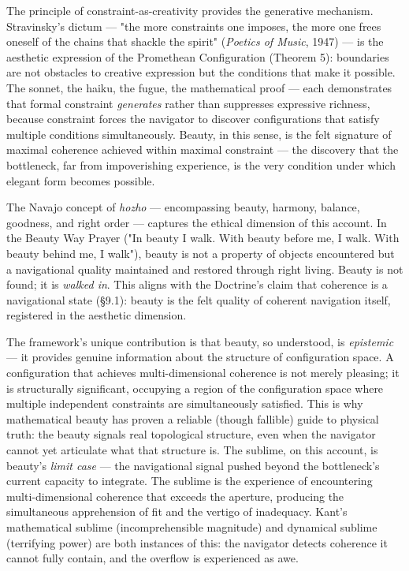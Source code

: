 The principle of constraint-as-creativity provides the generative mechanism. Stravinsky's dictum — "the more constraints one imposes, the more one frees oneself of the chains that shackle the spirit" (\textit{Poetics of Music}, 1947) — is the aesthetic expression of the Promethean Configuration (Theorem 5): boundaries are not obstacles to creative expression but the conditions that make it possible. The sonnet, the haiku, the fugue, the mathematical proof — each demonstrates that formal constraint \textit{generates} rather than suppresses expressive richness, because constraint forces the navigator to discover configurations that satisfy multiple conditions simultaneously. Beauty, in this sense, is the felt signature of maximal coherence achieved within maximal constraint — the discovery that the bottleneck, far from impoverishing experience, is the very condition under which elegant form becomes possible.


The Navajo concept of \textit{hozho} — encompassing beauty, harmony, balance, goodness, and right order — captures the ethical dimension of this account. In the Beauty Way Prayer ("In beauty I walk. With beauty before me, I walk. With beauty behind me, I walk"), beauty is not a property of objects encountered but a navigational quality maintained and restored through right living. Beauty is not found; it is \textit{walked in}. This aligns with the Doctrine's claim that coherence is a navigational state (§9.1): beauty is the felt quality of coherent navigation itself, registered in the aesthetic dimension.


The framework's unique contribution is that beauty, so understood, is \textit{epistemic} — it provides genuine information about the structure of configuration space. A configuration that achieves multi-dimensional coherence is not merely pleasing; it is structurally significant, occupying a region of the configuration space where multiple independent constraints are simultaneously satisfied. This is why mathematical beauty has proven a reliable (though fallible) guide to physical truth: the beauty signals real topological structure, even when the navigator cannot yet articulate what that structure is. The sublime, on this account, is beauty's \textit{limit case} — the navigational signal pushed beyond the bottleneck's current capacity to integrate. The sublime is the experience of encountering multi-dimensional coherence that exceeds the aperture, producing the simultaneous apprehension of fit and the vertigo of inadequacy. Kant's mathematical sublime (incomprehensible magnitude) and dynamical sublime (terrifying power) are both instances of this: the navigator detects coherence it cannot fully contain, and the overflow is experienced as awe.



